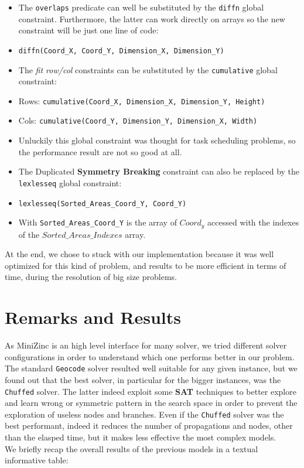 \begin{itemize}
    \item The \texttt{overlaps} predicate can well be substituted by the \texttt{diffn} global constraint.
            Furthermore, the latter can work directly on arrays so the new constraint will be just one line of code:
    \item[] \verb|diffn(Coord_X, Coord_Y, Dimension_X, Dimension_Y)|
    \item The \textit{fit row/col} constraints can be substituted by the \texttt{cumulative} global constraint:
    \item[] Rows: \verb|cumulative(Coord_X, Dimension_X, Dimension_Y, Height)|
    \item[] Cols: \verb|cumulative(Coord_Y, Dimension_Y, Dimension_X, Width)|
    \item[] Unluckily this global constraint was thought for task scheduling problems, so the performance result are not so good at all.
    \item The Duplicated \textbf{Symmetry Breaking} constraint can also be replaced by the \texttt{lexlesseq} global constraint:
    \item[] \verb|lexlesseq(Sorted_Areas_Coord_Y, Coord_Y)|
    \item[] With \verb|Sorted_Areas_Coord_Y| is the array of $Coord_y$ accessed with the indexes of the $Sorted\_Areas\_Indexes$ array.   
\end{itemize}

At the end, we chose to stuck with our implementation because it was well optimized for this kind of problem, and results to be more
efficient in terms of time, during the resolution of big size problems.




\newpage
\section{Remarks and Results}
As MiniZinc is an high level interface for many solver, we tried different solver configurations in order to understand which one performs better
in our problem. The standard \texttt{Geocode} solver resulted well suitable for any given instance, but we found out that the best solver, in particular
for the bigger instances, was the \texttt{Chuffed} solver. The latter indeed exploit some \textbf{SAT} techniques to better explore and learn wrong or symmetric
pattern in the search space in order to prevent the exploration of useless nodes and branches. Even if the \texttt{Chuffed} solver was the best performant,
indeed it reduces the number of propagations and nodes, other than the elasped time, but it makes less effective the most complex models.\\ 

We briefly recap the overall results of the previous models in a textual informative table:

